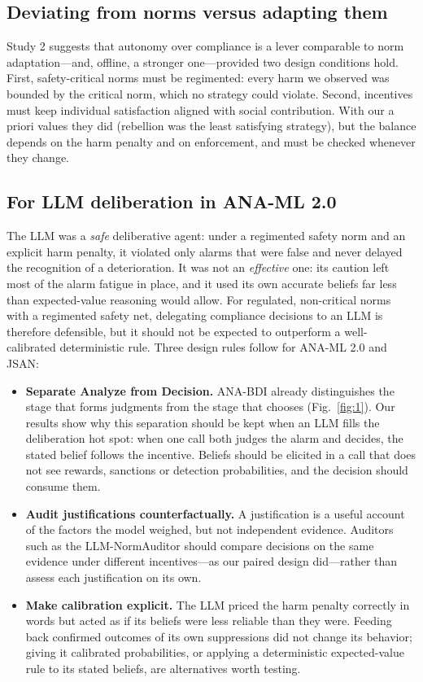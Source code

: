 \documentclass{ieeeaccess}
\begin{document}
\subsection{Deviating from norms versus adapting them}\label{sec:6.5}
Study 2 suggests that autonomy over compliance is a lever comparable to norm adaptation—and, offline, a stronger one—provided two design conditions hold. First, safety-critical norms must be regimented: every harm we observed was bounded by the critical norm, which no strategy could violate. Second, incentives must keep individual satisfaction aligned with social contribution. With our a priori values they did (rebellion was the least satisfying strategy), but the balance depends on the harm penalty and on enforcement, and must be checked whenever they change.

\subsection{For LLM deliberation in ANA-ML 2.0}\label{sec:6.6}
The LLM was a \emph{safe} deliberative agent: under a regimented safety norm and an explicit harm penalty, it violated only alarms that were false and never delayed the recognition of a deterioration. It was not an \emph{effective} one: its caution left most of the alarm fatigue in place, and it used its own accurate beliefs far less than expected-value reasoning would allow. For regulated, non-critical norms with a regimented safety net, delegating compliance decisions to an LLM is therefore defensible, but it should not be expected to outperform a well-calibrated deterministic rule. Three design rules follow for ANA-ML 2.0 and JSAN:

\begin{itemize}
\item \textbf{Separate Analyze from Decision.} ANA-BDI already distinguishes the stage that forms judgments from the stage that chooses (Fig.~\ref{fig:1}). Our results show why this separation should be kept when an LLM fills the deliberation hot spot: when one call both judges the alarm and decides, the stated belief follows the incentive. Beliefs should be elicited in a call that does not see rewards, sanctions or detection probabilities, and the decision should consume them.
\item \textbf{Audit justifications counterfactually.} A justification is a useful account of the factors the model weighed, but not independent evidence. Auditors such as the LLM-NormAuditor should compare decisions on the same evidence under different incentives—as our paired design did—rather than assess each justification on its own.
\item \textbf{Make calibration explicit.} The LLM priced the harm penalty correctly in words but acted as if its beliefs were less reliable than they were. Feeding back confirmed outcomes of its own suppressions did not change its behavior; giving it calibrated probabilities, or applying a deterministic expected-value rule to its stated beliefs, are alternatives worth testing.
\end{itemize}
\end{document}

